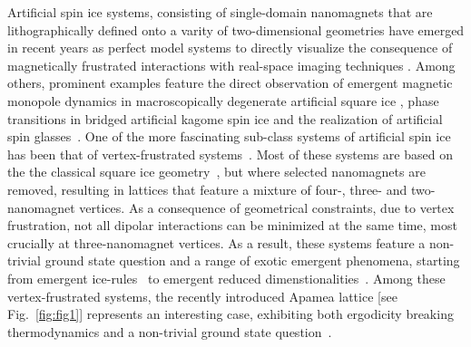 \documentclass[pre,reprint,superscriptaddress]{revtex4-2}
\begin{document}
Artificial spin ice systems, consisting of single-domain nanomagnets that are lithographically defined onto a varity of two-dimensional geometries have emerged in recent years as perfect model systems to directly visualize the consequence of magnetically frustrated interactions with real-space imaging techniques \cite{Skjaervo2020}. Among others, prominent examples feature the direct observation of emergent magnetic monopole dynamics in macroscopically degenerate artificial square ice \cite{Farhan2019}, phase transitions in bridged artificial kagome spin ice \cite{Hofhuis2022,Brunn2021} and the realization of artificial spin glasses~\cite{Saccone2020,Saccone2022}. One of the more fascinating sub-class systems of artificial spin ice has been that of vertex-frustrated systems~\cite{Gilbert2014,Gilbert2015,Saglam2021,Stopfel2018,Saccone2019,Strongina2021,Saccone2023}. Most of these systems are based on the the classical square ice geometry~\cite{Wang2006}, but where selected nanomagnets are removed, resulting in lattices that feature a mixture of four-, three- and two-nanomagnet vertices. As a consequence of geometrical constraints, due to vertex frustration, not all dipolar interactions can be minimized at the same time, most crucially at three-nanomagnet vertices. As a result, these systems feature a non-trivial ground state question and a range of exotic emergent phenomena, starting from emergent ice-rules~\cite{Gilbert2014,Saccone2019} to emergent reduced dimenstionalities~\cite{Gilbert2015}. Among these vertex-frustrated systems, the recently introduced Apamea lattice [see Fig.~\ref{fig:fig1}] represents an interesting case, exhibiting both ergodicity breaking thermodynamics and a non-trivial ground state question~\cite{Saccone2023}.
\end{document}
